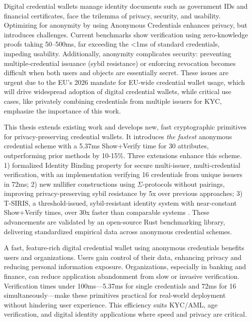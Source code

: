 
Digital credential wallets manage identity documents such as government IDs and financial certificates, face the trilemma of privacy, security, and usability. Optimizing for anonymity by using Anonymous Credentials enhances privacy, but introduces challenges. Current benchmarks show verification using zero-knowledge proofs taking 50–500ms, far exceeding the <1ms of standard credentials, impeding usability. Additionally, anonymity complicates security: preventing multiple-credential issuance (sybil resistance) or enforcing revocation becomes difficult when both users and objects are essentially secret. These issues are urgent due to the EU’s 2026 mandate for EU-wide credential wallet usage, which will drive widespread adoption of digital credential wallets, while critical use cases, like privately combining credentials from multiple issuers for KYC, emphasize the importance of this work.

This thesis extends existing work and develops new, fast cryptographic primitives for privacy-preserving credential wallets. It introduces \emph{the fastest} anonymous credential scheme with a 5.37ms Show+Verify time for 30 attributes, outperforming prior methods by 10-15\%. Three extensions enhance this scheme. 1) formalized Identity Binding property for secure multi-issuer, multi-credential verification, with an implementation verifying 16 credentials from unique issuers in 72ms; 2) new nullifier constructions using $\Sigma$-protocols without pairings, improving privacy-preserving sybil resistance by 5x over previous approaches; 3) T-SIRIS, a threshold-issued, sybil-resistant identity system with near-constant Show+Verify times, over 30x faster than comparable systems \cite{rabaninejad_attribute-based_2024}.
These advancements are validated by an open-source Rust benchmarking library, delivering standardized empirical data across anonymous credential schemes.

A fast, feature-rich digital credential wallet using anonymous credentials benefits users and organizations. Users gain control of their data, enhancing privacy and reducing personal information exposure. Organizations, especially in banking and finance, can reduce application abandonment from slow or invasive verification. Verification times under 100ms—5.37ms for single credentials and 72ms for 16 simultaneously—make these primitives practical for real-world deployment without hindering user experience. This efficiency suits KYC/AML, age verification, and digital identity applications where speed and privacy are critical.
